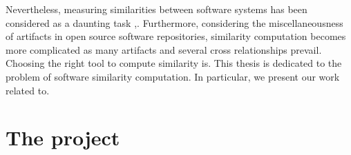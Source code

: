 Nevertheless, measuring similarities between software systems has been considered as a daunting task \cite{Chen:2015:SFD:2684822.2685305},\cite{McMillan:2012:DSS:2337223.2337267}. Furthermore, considering the miscellaneousness of artifacts in open source software repositories, similarity computation becomes more complicated as many artifacts and several cross relationships prevail. Choosing the right tool to compute similarity is. This thesis is dedicated to the problem of software similarity computation. In particular, we present our work related to.




\section{The \projectName project}

